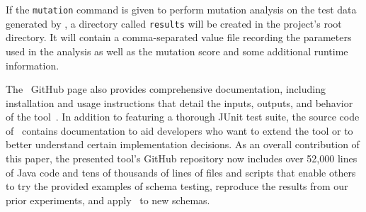 If the \lstinline{mutation} command is given to perform mutation analysis on the test data generated by \sa, a directory
called \lstinline{results} will be created in the project's root directory. It will contain a comma-separated value file
recording the parameters used in the analysis as well as the mutation score and some additional runtime information.


The \sa~GitHub page also provides comprehensive documentation, including installation and usage instructions that detail
the inputs, outputs, and behavior of the tool~\cite{tool}. In addition to featuring a thorough JUnit test suite, the
source code of \sa~contains documentation to aid developers who want to extend the tool or to better understand certain
implementation decisions. As an overall contribution of this paper, the presented tool's GitHub repository now includes
over 52,000 lines of Java code and tens of thousands of lines of files and scripts that enable others to try the
provided examples of schema testing, reproduce the results from our prior experiments, and apply \sa~to new schemas.



